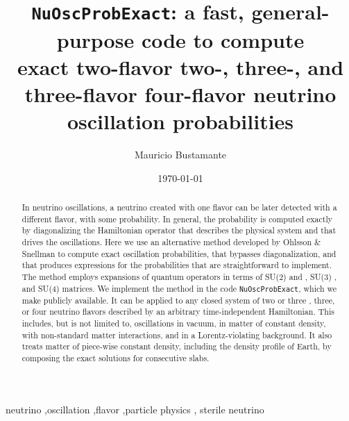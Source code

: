 \documentclass[final,5p,times,twocolumn]{elsarticle}
\providecommand{\DIFaddtex}[1]{{\protect\color{blue} \sf #1}} %
\providecommand{\DIFdeltex}[1]{{\protect\color{red} \scriptsize #1}} %
\providecommand{\DIFaddbegin}{} %
\providecommand{\DIFaddend}{} %
\providecommand{\DIFdelbegin}{} %
\providecommand{\DIFdelend}{} %
\providecommand{\DIFadd}[1]{\DIFaddtex{#1}} %
\providecommand{\DIFdel}[1]{\DIFdeltex{#1}} %
\begin{document}
\begin{frontmatter}

\title{{\tt NuOscProbExact}: a \DIFaddbegin \DIFadd{fast, }\DIFaddend general-purpose code to compute\\
exact \DIFdelbegin \DIFdel{two-flavor }\DIFdelend \DIFaddbegin \DIFadd{two-, three-, }\DIFaddend and \DIFdelbegin \DIFdel{three-flavor }\DIFdelend \DIFaddbegin \DIFadd{four-flavor }\DIFaddend neutrino oscillation probabilities}

\author{Mauricio Bustamante}
\DIFdelbegin %
\DIFdelend \DIFaddbegin \address{Niels Bohr International Academy, Niels Bohr Institute,\\University of Copenhagen, DK-2100 Copenhagen, Denmark}
\DIFaddend 

\date{\today}

\begin{abstract}

In neutrino oscillations, a neutrino created with one flavor can be later detected with a different flavor, with some probability.  In general, the probability is computed exactly by diagonalizing the Hamiltonian operator that describes the physical system and that drives the oscillations.  Here we use an alternative method developed by Ohlsson \& Snellman to compute exact oscillation probabilities, that bypasses diagonalization, and that produces expressions for the probabilities that are straightforward to implement.  The method employs expansions of quantum operators in terms of SU(2)\DIFdelbegin \DIFdel{and }\DIFdelend \DIFaddbegin \DIFadd{, }\DIFaddend SU(3)\DIFaddbegin \DIFadd{, and SU(4) }\DIFaddend matrices.  We implement the method in the code {\tt NuOscProbExact}, which we make publicly available.  It can be applied to any closed system of two\DIFdelbegin \DIFdel{or three}\DIFdelend \DIFaddbegin \DIFadd{, three, or four }\DIFaddend neutrino flavors described by an arbitrary time-independent Hamiltonian.  This includes, but is not limited to, oscillations in vacuum, in matter of constant density, with non-standard matter interactions, and in a Lorentz-violating background.  \DIFaddbegin \DIFadd{It also treats matter of piece-wise constant density, including the density profile of Earth, by composing the exact solutions for consecutive slabs.
}\DIFaddend 

\end{abstract}

\begin{keyword}

neutrino \sep oscillation \sep flavor \sep particle physics \DIFaddbegin \sep \DIFadd{sterile neutrino
}\DIFaddend 

\end{keyword}

\end{frontmatter}
\end{document}
